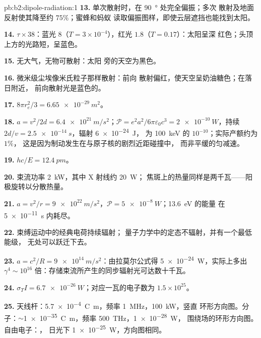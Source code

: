 \begin{solution}{pb:b2:dipole-radiation:1}
\textbf{13.} 单次散射时，在 \qty{90}{\degree} 处完全偏振；多次
散射及地面反射使其降至约 $75\%$；蜜蜂和蚂蚁
读取偏振图样，即使云层遮挡也能找到太阳。

\textbf{14.} $\tau \times 38$：蓝光 $8$（$T = 3 \times 10^{-4}$），红光 $1.8$（$T = 0.17$）：太阳呈深
红色；头顶上方的光路短，呈蓝色。

\textbf{15.} 无大气，无物可散射：太阳
旁的天空为黑色。

\textbf{16.} 微米级尘埃像米氏粒子那样散射：前向
散射偏红，使天空呈奶油糖色；在落日附近，
前向散射光是蓝色的。

\textbf{17.} $8\pi r_e^2/3 = \qty{6.65e-29}{m^2}$。

\textbf{18.} $a = v^2/2d = \qty{6.4e21}{m/s^2}$；$\mathcal P = e^2a^2/6\pi\varepsilon_0c^3 =
\qty{2e-10}{W}$，持续 $2d/v = \qty{2.5e-14}{s}$，辐射 \qty{6e-24}{J}，
为 \qty{100}{keV} 的 $10^{-10}$；实际产额约为 $1\%$，
这是因为制动发生在与原子核的剧烈近距碰撞中，
而非平缓的匀减速。

\textbf{19.} $hc/E = \qty{12.4}{pm}$。

\textbf{20.} 束流功率 \qty{2}{kW}，其中 X 射线约 \qty{20}{W}；
焦斑上的热量同样是两千瓦——阳极旋转以分散热量。

\textbf{21.} $a = v^2/r = \qty{9e22}{m/s^2}$，$\mathcal P = \qty{5e-8}{W}$；\qty{13.6}{eV} 的能量
在 \qty{5e-11}{s} 内耗尽。

\textbf{22.} 束缚运动中的经典电荷持续辐射；
量子力学中的定态不辐射，并有一个最低能级，
无处可以跃迁下去。

\textbf{23.} $a = c^2/R = \qty{9e14}{m/s^2}$：由拉莫尔公式得 \qty{5e-24}{W}，实际上多出 $\gamma^4 \sim 10^{16}$
倍：存储束流所产生的同步辐射光可达数十千瓦。
%

\textbf{24.} $\sigma_TI = \qty{6.7e-26}{W}$；对应一瓦的电子数为 $1.5 \times 10^{25}$。

\textbf{25.} 天线杆：\qty{5.7e-4}{C.m}，频率 \qty{1}{MHz}，\qty{100}{kW}，竖直
环形方向图。分子：$\sim$\qty{1e-35}{C.m}，频率 \qty{500}{THz}，\qty{1e-28}{W}，
围绕场的环形方向图。自由电子：，
日光下 \qty{1e-25}{W}，方向图相同。
\end{solution}
